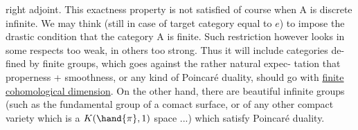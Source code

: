 right adjoint.  This exactness property is not satisfied of course
when A is discrete infinite.   We  may think (still in case of
 target category equal to $e$) to impose the drastic condition that the
category A is finite.  Such restriction however looks in some respects
too weak,  in others too strong.  Thus it will include categories de-%
fined by finite groups, which goes against the rather natural expec-%
tation that properness + smoothness,  or any kind of Poincaré duality,
should go with \uline{finite cohomological dimension}.  On the other hand,
there are beautiful infinite groups (such as the fundamental group
of a  comact surface,  or of any other compact variety which is a
$K(\hand{\pi},1)$ space ...) which satisfy Poincaré duality.



